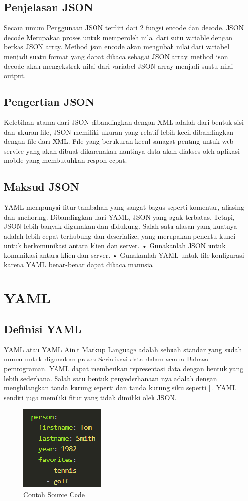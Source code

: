 \subsection{Penjelasan JSON}
Secara umum Penggunaan JSON terdiri dari 2 fungsi encode dan decode.  JSON decode Merupakan proses untuk  memperoleh nilai dari sutu variable dengan berkas JSON array. Method json encode akan mengubah nilai dari variabel  menjadi suatu format yang dapat dibaca sebagai JSON array. method json decode  akan mengekstrak nilai dari variabel JSON array  menjadi suatu nilai output.
\subsection{Pengertian JSON}
Kelebihan utama dari JSON dibandingkan dengan XML adalah dari bentuk sisi dan ukuran file, JSON memiliki ukuran yang relatif  lebih kecil dibandingkan dengan file dari XML. File yang berukuran keciil sanagat penting untuk web service yang akan dibuat dikarenakan nantinya data akan diakses oleh aplikasi mobile yang membutuhkan respon cepat.
\subsection{Maksud JSON}
YAML mempunyai fitur tambahan yang sangat bagus seperti komentar, aliasing dan anchoring.  Dibandingkan dari YAML, JSON yang agak terbatas. Tetapi, JSON lebih banyak digunakan dan didukung. Salah satu alasan yang kuatnya adalah lebih cepat terhubung dan deserialize, yang merupakan penentu kunci untuk berkomunikasi antara klien dan server.
•	Gunakanlah JSON untuk komunikasi antara klien dan server.
•	Gunakanlah YAML untuk file konfigurasi karena YAML benar-benar dapat dibaca manusia.
\section{YAML}
\subsection{Definisi YAML}
YAML atau YAML Ain't Markup Language adalah sebuah standar yang sudah umum untuk digunakan proses Serialisasi data dalam semua Bahasa pemrograman. YAML dapat memberikan representasi data dengan bentuk yang lebih sederhana. Salah satu bentuk penyederhanaan nya adalah dengan menghilangkan tanda kurung seperti {} dan tanda kurung siku seperti []. YAML sendiri juga memiliki fitur yang tidak dimiliki oleh JSON.
\begin{figure}[ht]
\centerline{\includegraphics[scale=1]{figures/5SC.png} }

\caption{Contoh Source Code} 
\label{Sc}
\end{figure}

